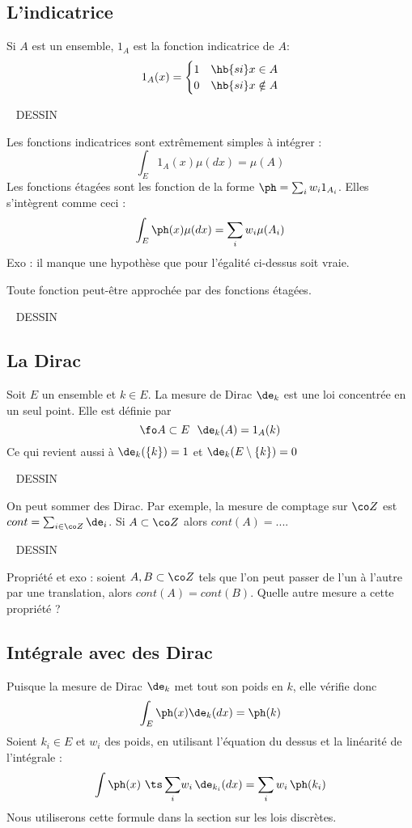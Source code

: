\documentclass{article}
\def\dessin{\ \linebreak \vspace{0.5cm}  \linebreak  DESSIN  \vspace{1cm} \ \linebreak   }
\begin{document}
\subsection{L'indicatrice}

Si $A$ est un ensemble, $1_A$ est la fonction indicatrice de $A$:     
$$
1_A(x)=
\begin{cases}
1 &  \hb{ si } x\in A \\
0 &  \hb{ si } x\notin A 
\end{cases}
$$

\dessin

Les fonctions indicatrices sont extrêmement simples à intégrer : 
$$
\int_E 1_A (x) \mu(dx) = \mu(A)
$$
Les fonctions étagées sont les fonction de la forme $\ph=\sum_i w_i 1_{A_i}$. Elles s'intègrent comme ceci : 
$$
\int_E \ph (x) \mu(dx) =  \sum_i w_i  \mu(A_i)
$$
Exo : il manque une  hypothèse que pour l'égalité ci-dessus soit vraie. 


Toute fonction  peut-être approchée par des fonctions étagées. 

\dessin

\subsection{La Dirac}

Soit  $E$ un ensemble et $k\in E$.  La mesure de Dirac $\de_k$ est une loi concentrée en un seul point. Elle  est définie par 
$$
\fo A \subset E \ \ \de_k(A) = 1_A(k) 
$$
Ce qui revient aussi à $\de_k(\{k\})=1$ et $\de_k(E \setminus \{k\})=0$ 

\dessin

On peut sommer des Dirac. Par exemple, la mesure de comptage sur $\co Z$ est $cont = \sum_{i\in \co Z} \de_i$.  Si $A\subset \co Z$ alors $cont(A) = ...$. 

\dessin

Propriété et exo : soient   $A,B\subset \co Z$ tels que l'on peut passer de l'un à l'autre par une translation, alors $cont(A) = cont(B)$. Quelle autre mesure a cette propriété ? 


\subsection{Intégrale avec des Dirac}

Puisque  la mesure de Dirac $\de_k$ met tout son poids en $k$, elle  vérifie donc 
$$
 \int_E \ph(x) \de_k(dx) = \ph(k)
$$
Soient $k_i \in E$ et $w_i$ des poids, en utilisant l'équation du dessus et la linéarité de l'intégrale :
$$
\int  \ph (x)  \      {\ts\sum_i} w_i\, \de_{k_i}(dx)    = \sum_i w_i \, \ph(k_i)
$$
 Nous utiliserons cette formule dans la section sur les lois discrètes. 
\end{document}
